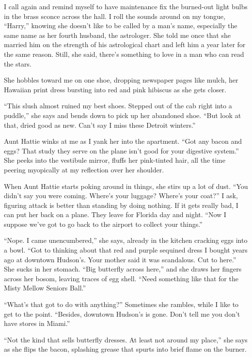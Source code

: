 \documentclass[twoside,10pt]{book}
\begin{document}
I call again and remind myself to have maintenance fix the burned-out
light bulbs in the brass sconce across the hall. I roll the sounds
around on my tongue, ``Harry,'' knowing she doesn't like to be called by
a man's name, especially the same name as her fourth husband, the
astrologer. She told me once that she married him on the strength of his
astrological chart and left him a year later for the same reason. Still,
she said, there's something to love in a man who can read the stars.

She hobbles toward me on one shoe, dropping newspaper pages like mulch,
her Hawaiian print dress bursting into red and pink hibiscus as she gets
closer.

``This slush almost ruined my best shoes. Stepped out of the cab right
into a puddle,'' she says and bends down to pick up her abandoned shoe.
``But look at that, dried good as new. Can't say I miss these Detroit
winters.''

Aunt Hattie winks at me as I yank her into the apartment. ``Got any
bacon and eggs? That study they serve on the plane isn't good for your
digestive system.'' She peeks into the vestibule mirror, fluffs her
pink-tinted hair, all the time peering myopically at my reflection over
her shoulder.

When Aunt Hattie starts poking around in things, she stirs up a lot of
dust. ``You didn't say you were coming. Where's your luggage? Where's
your coat?'' I ask, figuring attack is better than standing by doing
nothing. If it gets really bad, I can put her back on a plane. They
leave for Florida day and night. ``Now I suppose we've got to go back to
the airport to collect your things.''

``Nope. I came unencumbered,'' she says, already in the kitchen cracking
eggs into a bowl. ``Got to thinking about that red and purple sequined
dress I bought years ago at downtown Hudson's. Your mother said it was
scandalous. Cut to here.'' She sucks in her stomach. ``Big butterfly
across here,'' and she draws her fingers across her bosom, leaving
traces of egg shell. ``Need something like that for the Misty Mellow
Seniors Ball.''

``What's that got to do with anything?'' Sometimes she rambles, while I
like to get to the point. ``Besides, downtown Hudson's is gone. Don't
tell me you don't have stores in Miami.''

``Not the kind that sells butterfly dresses. At least not around my
place,'' she says as she flips the bacon, splashing grease that spurts
into brief flame on the burner.
\end{document}
